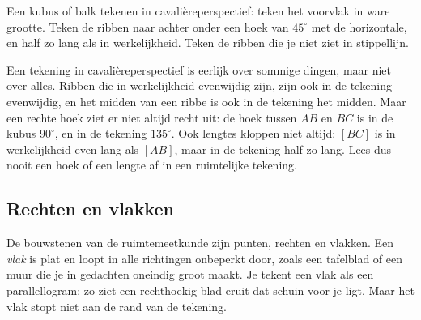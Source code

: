 \begin{werkwijze}
Een kubus of balk tekenen in cavalièreperspectief: teken het voorvlak in ware grootte. Teken de ribben naar achter onder een hoek van $45^\circ$ met de horizontale, en half zo lang als in werkelijkheid. Teken de ribben die je niet ziet in stippellijn.
\end{werkwijze}

Een tekening in cavalièreperspectief is eerlijk over sommige dingen, maar niet over alles. Ribben die in werkelijkheid evenwijdig zijn, zijn ook in de tekening evenwijdig, en het midden van een ribbe is ook in de tekening het midden. Maar een rechte hoek ziet er niet altijd recht uit: de hoek tussen $AB$ en $BC$ is in de kubus $90^\circ$, en in de tekening $135^\circ$. Ook lengtes kloppen niet altijd: $[BC]$ is in werkelijkheid even lang als $[AB]$, maar in de tekening half zo lang. Lees dus nooit een hoek of een lengte af in een ruimtelijke tekening.


\begin{oefeningen}
\end{oefeningen}

\subsection{Rechten en vlakken}

De bouwstenen van de ruimtemeetkunde zijn punten, rechten en vlakken. Een \emph{vlak} is plat en loopt in alle richtingen onbeperkt door, zoals een tafelblad of een muur die je in gedachten oneindig groot maakt. Je tekent een vlak als een parallellogram: zo ziet een rechthoekig blad eruit dat schuin voor je ligt. Maar het vlak stopt niet aan de rand van de tekening.


